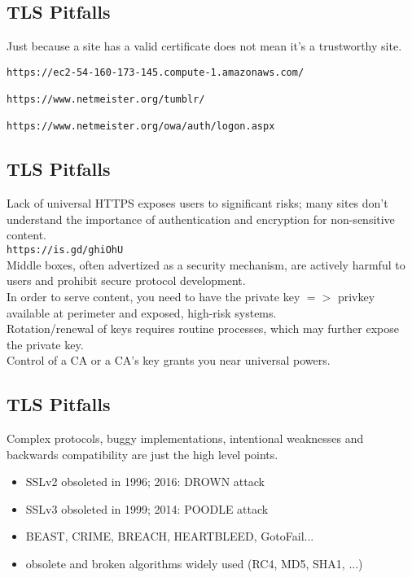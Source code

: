 \documentclass[xga]{xdvislides}
\begin{document}
\subsection{TLS Pitfalls}
Just because a site has a valid certificate does not
mean it's a trustworthy site. \\

\begin{verbatim}
https://ec2-54-160-173-145.compute-1.amazonaws.com/

https://www.netmeister.org/tumblr/

https://www.netmeister.org/owa/auth/logon.aspx
\end{verbatim}


\subsection{TLS Pitfalls}
Lack of universal HTTPS exposes users to significant
risks; many sites don't understand the importance of
authentication and encryption for non-sensitive content. \\

\verb+https://is.gd/ghiOhU+ \\

Middle boxes, often advertized as a security
mechanism, are actively harmful to users and prohibit
secure protocol development. \\

In order to serve content, you need to have the
private key $ => $ privkey available at perimeter and
exposed, high-risk systems. \\

Rotation/renewal of keys requires routine processes,
which may further expose the private key. \\

Control of a CA or a CA's key grants you near
universal powers. \\


\subsection{TLS Pitfalls}
Complex protocols, buggy implementations, intentional
weaknesses and backwards compatibility are just the
high level points.

\begin{itemize}
	\item SSLv2 obsoleted in 1996; 2016: DROWN attack
	\item SSLv3 obsoleted in 1999; 2014: POODLE attack
	\item BEAST, CRIME, BREACH, HEARTBLEED, GotoFail...
	\item obsolete and broken algorithms widely used (RC4, MD5, SHA1, ...)
\end{itemize}
\end{document}
